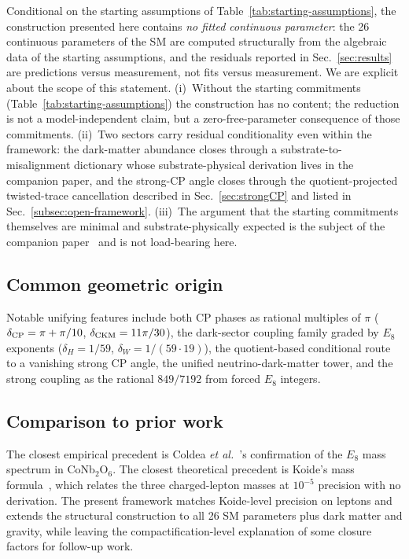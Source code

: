 ﻿\documentclass[reprint,amsmath,amssymb,aps,prd,longbibliography,floatfix]{revtex4-2}
\begin{document}
Conditional on the starting assumptions of
Table~\ref{tab:starting-assumptions}, the construction presented here
contains \emph{no fitted continuous parameter}: the 26 continuous
parameters of the SM are computed structurally from the algebraic
data of the starting assumptions, and the residuals reported in
Sec.~\ref{sec:results} are predictions versus measurement, not fits
versus measurement. We are explicit about the scope of this
statement. (i)~Without the starting commitments
(Table~\ref{tab:starting-assumptions}) the construction has no
content; the reduction is not a model-independent claim, but a
zero-free-parameter consequence of those commitments.
(ii)~Two sectors carry residual conditionality even within the
framework: the dark-matter abundance closes through a
substrate-to-misalignment dictionary whose substrate-physical
derivation lives in the companion paper, and the strong-CP angle
closes through the quotient-projected twisted-trace cancellation
described in Sec.~\ref{sec:strongCP} and listed in
Sec.~\ref{subsec:open-framework}. (iii)~The argument that the starting
commitments themselves are minimal and substrate-physically expected
is the subject of the companion paper~\cite{UnreasonableEffectiveness}
and is not load-bearing here.

\subsection{Common geometric origin}

Notable unifying features include both CP phases as rational multiples
of $\pi$ ($\delta_{\rm CP} = \pi + \pi/10$, $\delta_{\rm CKM} = 11\pi/30$),
the dark-sector coupling family graded by $E_8$ exponents
($\delta_H = 1/59$, $\delta_W = 1/(59 \cdot 19)$), the quotient-based
conditional route to a vanishing strong CP angle, the unified
neutrino-dark-matter tower, and the strong coupling as the rational
$849/7192$ from forced $E_8$ integers.

\subsection{Comparison to prior work}

The closest empirical precedent is Coldea \textit{et al.}~\cite{Coldea2010}'s
confirmation of the $E_8$ mass spectrum in CoNb$_2$O$_6$. The closest
theoretical precedent is Koide's mass formula~\cite{Koide1981}, which
relates the three charged-lepton masses at $10^{-5}$ precision with no
derivation. The present framework matches Koide-level precision on
leptons and extends the structural construction to all 26 SM parameters
plus dark matter and gravity, while leaving the compactification-level
explanation of some closure factors for follow-up work.
\end{document}
